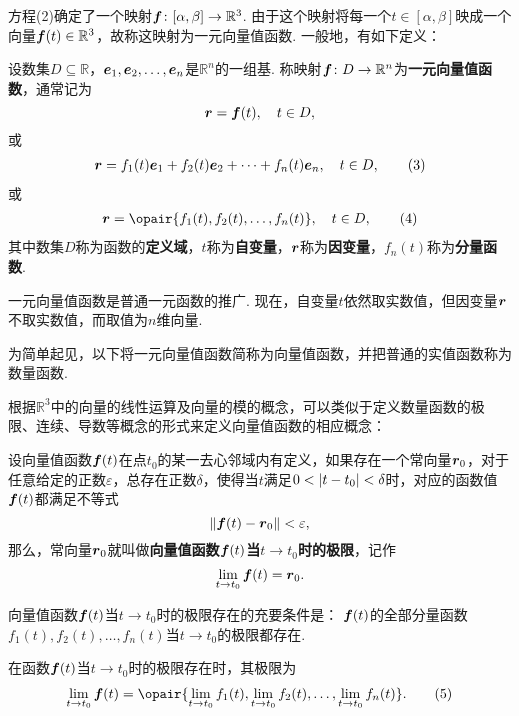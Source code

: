 方程(2)确定了一个映射\(\boldsymbol{f}\colon [\alpha,\beta]\to\mathbb{R}^3\).
由于这个映射将每一个\(t\in[\alpha,\beta]\)映成一个向量\(\boldsymbol{f}(t)\in\mathbb{R}^3\)，故称这映射为一元向量值函数.
一般地，有如下定义：
\begin{definition}
设数集\(D \subseteq \mathbb{R}\)，\(\boldsymbol{e}_1,\boldsymbol{e}_2,\dotsc,\boldsymbol{e}_n\)是\(\mathbb{R}^n\)的一组基.
称映射\(\boldsymbol{f}\colon D\to\mathbb{R}^n\)为\textbf{一元向量值函数}，通常记为\[
\boldsymbol{r}=\boldsymbol{f}(t), \quad t \in D,
\]或\begin{gather}
\mat{r}=f_1(t)\mat{e}_1+f_2(t)\mat{e}_2+\dotsb+f_n(t)\mat{e}_n, \quad t \in D,
\tag3
\end{gather}或\begin{gather}
\mat{r}=\opair{f_1(t),f_2(t),\dotsc,f_n(t)}, \quad t \in D,
\tag4
\end{gather}其中数集\(D\)称为函数的\textbf{定义域}，\(t\)称为\textbf{自变量}，\(\boldsymbol{r}\)称为\textbf{因变量}，\(f_n(t)\)称为\textbf{分量函数}.
\end{definition}
一元向量值函数是普通一元函数的推广.
现在，自变量\(t\)依然取实数值，但因变量\(\boldsymbol{r}\)不取实数值，而取值为\(n\)维向量.

为简单起见，以下将一元向量值函数简称为向量值函数，并把普通的实值函数称为数量函数.

根据\(\mathbb{R}^3\)中的向量的线性运算及向量的模的概念，可以类似于定义数量函数的极限、连续、导数等概念的形式来定义向量值函数的相应概念：
\begin{definition}
设向量值函数\(\boldsymbol{f}(t)\)在点\(t_0\)的某一去心邻域内有定义，如果存在一个常向量\(\boldsymbol{r}_0\)，对于任意给定的正数\(\varepsilon\)，总存在正数\(\delta\)，使得当\(t\)满足\(0 < \abs{t-t_0} < \delta\)时，对应的函数值\(\boldsymbol{f}(t)\)都满足不等式\[
\norm{\boldsymbol{f}(t)-\boldsymbol{r}_0} < \varepsilon,
\]那么，常向量\(\boldsymbol{r}_0\)就叫做\textbf{向量值函数\(\boldsymbol{f}(t)\)当\(t \to t_0\)时的极限}，记作\[
\lim\limits_{t \to t_0} \boldsymbol{f}(t) = \boldsymbol{r}_0.
\]
\end{definition}

\begin{theorem}
\def\l{\lim\limits_{t \to t_0}}
向量值函数\(\boldsymbol{f}(t)\)当\(t \to t_0\)时的极限存在的充要条件是：
\(\boldsymbol{f}(t)\)的全部分量函数\(f_1(t),f_2(t),\dotsc,f_n(t)\)当\(t \to t_0\)的极限都存在.

在函数\(\boldsymbol{f}(t)\)当\(t \to t_0\)时的极限存在时，其极限为\begin{gather}
\l \mat{f}(t) = \opair{\l f_1(t),\l f_2(t),\dotsc,\l f_n(t)}.
\tag5
\end{gather}
\end{theorem}

